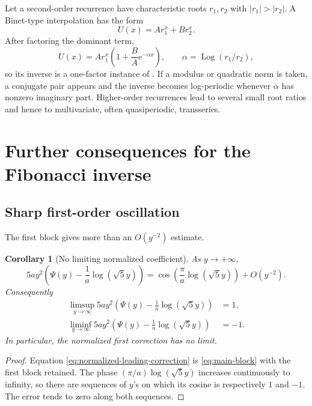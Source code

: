 \documentclass[11pt,oneside]{article}
\theoremstyle{plain}
\newtheorem{corollary}[theorem]{Corollary}
\theoremstyle{definition}
\theoremstyle{remark}
\newcommand{\e}{\mathrm{e}}
\newcommand{\abs}[1]{\left\lvert#1\right\rvert}
\newcommand{\Log}{\operatorname{Log}}
\begin{document}
Let a second-order recurrence have characteristic roots \(r_1,r_2\) with
\(\abs{r_1}>\abs{r_2}\).  A Binet-type interpolation has the form
\begin{equation}
 U(x)=A r_1^x+B r_2^x.
 \label{eq:general-Binet}
\end{equation}
After factoring the dominant term,
\begin{equation}
 U(x)=A r_1^x
 \left(1+\frac BA\e^{-\alpha x}\right),
 \qquad
 \alpha=\Log(r_1/r_2),
 \label{eq:general-Binet-factor}
\end{equation}
so its inverse is a one-factor instance of
.  If a modulus or quadratic norm is taken, a
conjugate pair appears and the inverse becomes log-periodic whenever
\(\alpha\) has nonzero imaginary part.  Higher-order recurrences lead to
several small root ratios and hence to multivariate, often quasiperiodic,
transseries.

\section{Further consequences for the Fibonacci inverse}
\label{sec:consequences}

\subsection{Sharp first-order oscillation}

The first block gives more than an \(O(y^{-2})\) estimate.

\begin{corollary}[No limiting normalized coefficient]
\label{cor:limsup-liminf}
As \(y\to+\infty\),
\begin{equation}
 5ay^2\left(\Psi(y)-\frac1a\log(\sqrt5y)\right)
 =\cos\left(\frac\pi a\log(\sqrt5y)\right)+O(y^{-2}).
 \label{eq:normalized-leading-correction}
\end{equation}
Consequently
\begin{align}
 \limsup_{y\to\infty}
 5ay^2\left(\Psi(y)-\frac1a\log(\sqrt5y)\right)&=1,
 \label{eq:limsup}\\
 \liminf_{y\to\infty}
 5ay^2\left(\Psi(y)-\frac1a\log(\sqrt5y)\right)&=-1.
 \label{eq:liminf}
\end{align}
In particular, the normalized first correction has no limit.
\end{corollary}

\begin{proof}
Equation \eqref{eq:normalized-leading-correction} is
\eqref{eq:main-block} with the first block retained.  The phase
\((\pi/a)\log(\sqrt5y)\) increases continuously to infinity, so there are
sequences of \(y\)'s on which its cosine is respectively \(1\) and \(-1\).
The error tends to zero along both sequences.
\end{proof}
\end{document}
